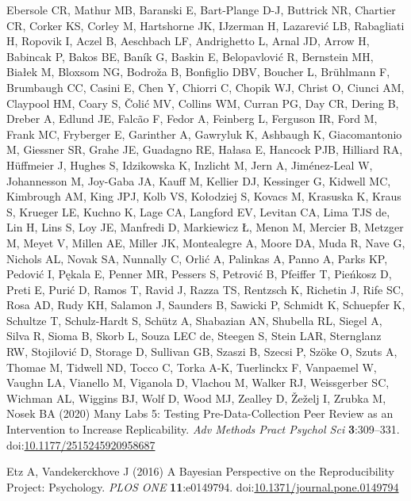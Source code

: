 \documentclass[
  english,
  a4paper,
]{article}
\newlength{\cslhangindent}
\newlength{\cslentryspacingunit} %
\newenvironment{CSLReferences}[2] %
 {%
  \setlength{\parindent}{0pt}
  \ifodd #1
  \let\oldpar\par
  \def\par{\hangindent=\cslhangindent\oldpar}
  \fi
  \setlength{\parskip}{#2\cslentryspacingunit}
 }%
 {}
\begin{document}
\begin{CSLReferences}{1}{0}
\leavevmode{}%
Ebersole CR, Mathur MB, Baranski E, Bart-Plange D-J, Buttrick NR, Chartier CR, Corker KS, Corley M, Hartshorne JK, IJzerman H, Lazarević LB, Rabagliati H, Ropovik I, Aczel B, Aeschbach LF, Andrighetto L, Arnal JD, Arrow H, Babincak P, Bakos BE, Baník G, Baskin E, Belopavlović R, Bernstein MH, Białek M, Bloxsom NG, Bodroža B, Bonfiglio DBV, Boucher L, Brühlmann F, Brumbaugh CC, Casini E, Chen Y, Chiorri C, Chopik WJ, Christ O, Ciunci AM, Claypool HM, Coary S, Čolić MV, Collins WM, Curran PG, Day CR, Dering B, Dreber A, Edlund JE, Falcão F, Fedor A, Feinberg L, Ferguson IR, Ford M, Frank MC, Fryberger E, Garinther A, Gawryluk K, Ashbaugh K, Giacomantonio M, Giessner SR, Grahe JE, Guadagno RE, Hałasa E, Hancock PJB, Hilliard RA, Hüffmeier J, Hughes S, Idzikowska K, Inzlicht M, Jern A, Jiménez-Leal W, Johannesson M, Joy-Gaba JA, Kauff M, Kellier DJ, Kessinger G, Kidwell MC, Kimbrough AM, King JPJ, Kolb VS, Kołodziej S, Kovacs M, Krasuska K, Kraus S, Krueger LE, Kuchno K, Lage CA, Langford EV, Levitan CA, Lima TJS de, Lin H, Lins S, Loy JE, Manfredi D, Markiewicz Ł, Menon M, Mercier B, Metzger M, Meyet V, Millen AE, Miller JK, Montealegre A, Moore DA, Muda R, Nave G, Nichols AL, Novak SA, Nunnally C, Orlić A, Palinkas A, Panno A, Parks KP, Pedović I, Pękala E, Penner MR, Pessers S, Petrović B, Pfeiffer T, Pieńkosz D, Preti E, Purić D, Ramos T, Ravid J, Razza TS, Rentzsch K, Richetin J, Rife SC, Rosa AD, Rudy KH, Salamon J, Saunders B, Sawicki P, Schmidt K, Schuepfer K, Schultze T, Schulz-Hardt S, Schütz A, Shabazian AN, Shubella RL, Siegel A, Silva R, Sioma B, Skorb L, Souza LEC de, Steegen S, Stein LAR, Sternglanz RW, Stojilović D, Storage D, Sullivan GB, Szaszi B, Szecsi P, Szöke O, Szuts A, Thomae M, Tidwell ND, Tocco C, Torka A-K, Tuerlinckx F, Vanpaemel W, Vaughn LA, Vianello M, Viganola D, Vlachou M, Walker RJ, Weissgerber SC, Wichman AL, Wiggins BJ, Wolf D, Wood MJ, Zealley D, Žeželj I, Zrubka M, Nosek BA (2020) Many {Labs} 5: {Testing Pre-Data-Collection Peer Review} as an {Intervention} to {Increase Replicability}. \emph{Adv Methods Pract Psychol Sci} \textbf{3}:309--331. doi:\href{https://doi.org/10.1177/2515245920958687}{10.1177/2515245920958687}

\leavevmode{}%
Etz A, Vandekerckhove J (2016) A {Bayesian Perspective} on the {Reproducibility Project}: {Psychology}. \emph{PLOS ONE} \textbf{11}:e0149794. doi:\href{https://doi.org/10.1371/journal.pone.0149794}{10.1371/journal.pone.0149794}


\end{CSLReferences}
\end{document}
